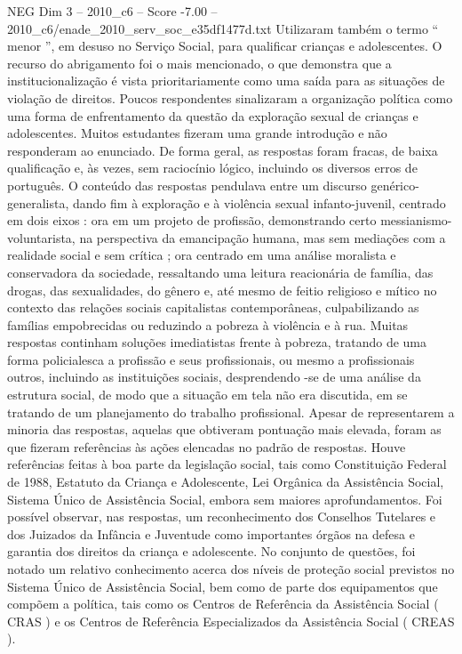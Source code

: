 \begin{textsample}{NEG Dim 3 – 2010\_c6 – Score -7.00 – 2010\_c6/enade\_2010\_serv\_soc\_e35df1477d.txt}
Utilizaram também o termo “ menor ”, em desuso no Serviço Social, para qualificar crianças e adolescentes.
O recurso do abrigamento foi o mais mencionado, o que demonstra que a institucionalização é vista prioritariamente como uma saída para as situações de violação de direitos.
Poucos respondentes sinalizaram a organização política como uma forma de enfrentamento da questão da exploração sexual de crianças e adolescentes.
Muitos estudantes fizeram uma grande introdução e não responderam ao enunciado.
De forma geral, as respostas foram fracas, de baixa qualificação e, às vezes, sem raciocínio lógico, incluindo os diversos erros de português.
O conteúdo das respostas pendulava entre um discurso genérico-generalista, dando fim à exploração e à violência sexual infanto-juvenil, centrado em dois eixos : ora em um projeto de profissão, demonstrando certo messianismo-voluntarista, na perspectiva da emancipação humana, mas sem mediações com a realidade social e sem crítica ; ora centrado em uma análise moralista e conservadora da sociedade, ressaltando uma leitura reacionária de família, das drogas, das sexualidades, do gênero e, até mesmo de feitio religioso e mítico no contexto das relações sociais capitalistas contemporâneas, culpabilizando as famílias empobrecidas ou reduzindo a pobreza à violência e à rua.
Muitas respostas continham soluções imediatistas frente à pobreza, tratando de uma forma policialesca a profissão e seus profissionais, ou mesmo a profissionais outros, incluindo as instituições sociais, desprendendo -se de uma análise da estrutura social, de modo que a situação em tela não era discutida, em se tratando de um planejamento do trabalho profissional.
Apesar de representarem a minoria das respostas, aquelas que obtiveram pontuação mais elevada, foram as que fizeram referências às ações elencadas no padrão de respostas.
Houve referências feitas à boa parte da legislação social, tais como Constituição Federal de 1988, Estatuto da Criança e Adolescente, Lei Orgânica da Assistência Social, Sistema Único de Assistência Social, embora sem maiores aprofundamentos.
Foi possível observar, nas respostas, um reconhecimento dos Conselhos Tutelares e dos Juizados da Infância e Juventude como importantes órgãos na defesa e garantia dos direitos da criança e adolescente.
No conjunto de questões, foi notado um relativo conhecimento acerca dos níveis de proteção social previstos no Sistema Único de Assistência Social, bem como de parte dos equipamentos que compõem a política, tais como os Centros de Referência da Assistência Social ( CRAS ) e os Centros de Referência Especializados da Assistência Social ( CREAS ).

\end{textsample}
